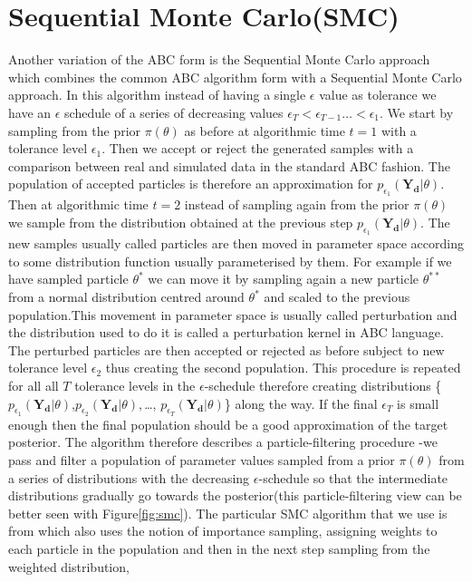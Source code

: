 \section{Sequential Monte Carlo(SMC)}
\label{sec:smc}
Another variation of the ABC form is the Sequential Monte Carlo approach\cite[] {toni2009abc} which combines the common ABC algorithm form with a Sequential Monte Carlo approach.  In this algorithm instead of having a single $\epsilon$ value as tolerance we have an $\epsilon$ schedule of a series of decreasing values $\epsilon_T < \epsilon_{T-1} \dots < \epsilon_{1}$. We start by sampling from the prior $\pi(\theta)$ as before at algorithmic time $t=1$ with a tolerance level $\epsilon_{1}$. Then we accept or reject the generated samples with a comparison between real and simulated data in the standard ABC fashion. The population of accepted particles is therefore an approximation for $p_{\epsilon_{1}}(\mathbf{Y_{d}}|\theta)$. Then at algorithmic time $t=2$ instead of sampling again from the prior $\pi(\theta)$ we sample from the distribution obtained at the previous step $p_{\epsilon_{1}}(\mathbf{Y_{d}}|\theta)$. The new samples usually called particles are then moved in parameter space according to some distribution function usually parameterised by them. For example if we have sampled particle $\theta^*$ we can move it by sampling again a new particle $\theta^{**}$ from a normal distribution centred around $\theta^*$ and scaled to the previous population.This movement in parameter space is usually called perturbation and the distribution used to do it is called a perturbation kernel in ABC language. The perturbed particles are then accepted or rejected as before subject to new tolerance level $\epsilon_{2}$ thus creating the second population. This procedure is repeated for all all $T$ tolerance levels in the $\epsilon$-schedule therefore creating distributions \{$p_{\epsilon_{1}}(\mathbf{Y_{d}}|\theta)$,$p_{\epsilon_{2}}(\mathbf{Y_{d}}|\theta), $\dots, $p_{\epsilon_{T}}(\mathbf{Y_{d}}|\theta)$\} along the way. If the final $\epsilon_{T}$ is small enough then the final population should be a good approximation of the target posterior.  The algorithm therefore describes a particle-filtering procedure -we pass and filter a population of parameter values sampled from a prior $\pi(\theta)$  from a series of distributions with the decreasing $\epsilon$-schedule so that the intermediate distributions gradually go towards the posterior(this particle-filtering view can be better seen with Figure\ref{fig:smc}). The particular SMC algorithm that we use is from \cite[] {toni2009abc} which also uses the notion of importance sampling, assigning weights to each particle in the population and then in the next step sampling from the weighted distribution,
